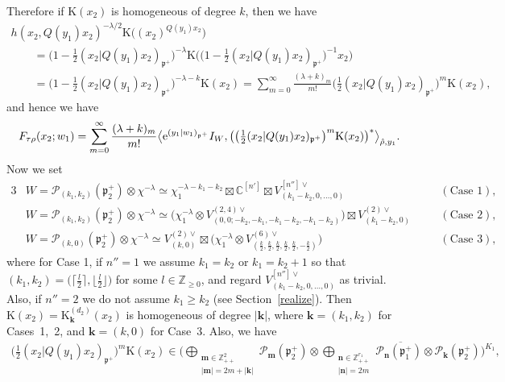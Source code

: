 \documentclass[pdftex]{sigma}
\numberwithin{equation}{section}
\newcommand{\bk}{\mathbf{k}}
\newcommand{\bm}{\mathbf{m}}
\newcommand{\bn}{\mathbf{n}}
\newcommand{\BZ}{\mathbb{Z}}
\newcommand{\BC}{\mathbb{C}}
\newcommand{\fp}{\mathfrak{p}}
\newcommand{\cP}{\mathcal{P}}
\newcommand{\rK}{\mathrm{K}}
\begin{document}
Therefore if $\rK(x_2)$ is homogeneous of degree $k$, then we have
\begin{gather*}
 h(x_2,Q(y_1)x_2)^{-\lambda/2}\rK\big((x_2)^{Q(y_1)x_2}\big)\\
 \qquad{} =\big(1-\tfrac{1}{2}(x_2|Q(y_1)x_2)_{\fp^+}\big)^{-\lambda}\rK\big(\big(1-\tfrac{1}{2}(x_2|Q(y_1)x_2)_{\fp^+}\big)^{-1}x_2\big)\\
\qquad{}=\big(1-\tfrac{1}{2}(x_2|Q(y_1)x_2)_{\fp^+}\big)^{-\lambda-k}\rK(x_2) =\sum_{m=0}^\infty \frac{(\lambda+k)_m}{m!}\big(\tfrac{1}{2}(x_2|Q(y_1)x_2)_{\fp^+}\big)^m\rK(x_2),
\end{gather*}
and hence we have
\begin{gather*}
F_{\tau\rho}(x_2;w_1)
=\sum_{m=0}^\infty \frac{(\lambda+k)_m}{m!}\big\langle {\rm e}^{(y_1|w_1)_{\fp^+}}I_W,
\big(\big(\tfrac{1}{2}(x_2|Q(y_1)x_2)_{\fp^+}\big)^m\rK(x_2)\big)^*\big\rangle_{\hat{\rho},y_1}.
\end{gather*}
Now we set
\begin{alignat*}{3}
& W=\cP_{(k_1,k_2)}(\fp^+_2)\otimes\chi^{-\lambda}
\simeq\chi_1^{-\lambda-k_1-k_2}\boxtimes \BC^{[n']}\boxtimes V_{(k_1-k_2,0,\ldots,0)}^{[n'']\vee} \quad && (\text{Case }1),& \\
& W=\cP_{(k_1,k_2)}(\fp^+_2)\otimes\chi^{-\lambda}
\simeq\big(\chi_1^{-\lambda}\otimes V_{(0,0;-k_2,-k_1,-k_1-k_2,-k_1-k_2)}^{(2,4)\vee}\big)\boxtimes V_{(k_1-k_2,0)}^{(2)\vee} \quad && (\text{Case }2),& \\
& W=\cP_{(k,0)}(\fp^+_2)\otimes\chi^{-\lambda}
\simeq V_{(k,0)}^{(2)\vee}\boxtimes\big(\chi_1^{-\lambda}\otimes
V_{\left(\frac{k}{2},\frac{k}{2},\frac{k}{2},\frac{k}{2},\frac{k}{2},-\frac{k}{2}\right)}^{(6)\vee}\big) \quad && (\text{Case }3),&
\end{alignat*}
where for Case 1, if $n''=1$ we assume $k_1=k_2$ or $k_1=k_2+1$ so that $(k_1,k_2)=\big(\big\lceil\frac{l}{2}\big\rceil,\big\lfloor\frac{l}{2}\big\rfloor\big)$ for some $l\in\BZ_{\ge 0}$, and regard $V_{(k_1-k_2,0,\ldots,0)}^{[n'']\vee}$ as trivial. Also, if $n''=2$ we do not assume $k_1\ge k_2$ (see Section~\ref{realize}). Then $\rK(x_2)=\rK_\bk^{(d_2)}(x_2)$ is homogeneous of degree $|\bk|$, where $\bk=(k_1,k_2)$ for Cases~1,~2, and $\bk=(k,0)$ for Case~3. Also, we have
\begin{gather*} \big(\tfrac{1}{2}(x_2|Q(y_1)x_2)_{\fp^+}\big)^m\rK(x_2)
\in\Big(\bigoplus_{\substack{\bm\in\BZ_{++}^2\\ |\bm|=2m+|\bk|}}\cP_\bm(\fp^+_2)\otimes
\overline{\bigoplus_{\substack{\bn\in\BZ_{++}^{r_1}\\ |\bn|=2m}}\cP_\bn(\fp^+_1)\otimes\cP_{\bk}(\fp^+_2)}\Big)^{K_1}, \end{gather*}
\end{document}
